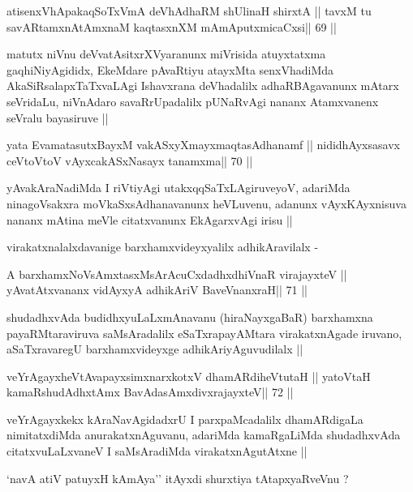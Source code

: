 \begin{shl}
atisenxVhA\s pakaqSoTxVmA deVhAdhaRM shUlinaH shirxtA ||
tavxM tu savARtamxnA\s\s tAmxnaM kaqtasxnXM mAmAputxmicaCxsi\hfill || 69 ||
\end{shl}

\begin{artha}
matutx niVnu deVvatAsitxrXVyaranunx miVrisida atuyxtatxma
gaqhiNiyAgididx, EkeMdare pAvaRtiyu atayxMta senxVhadiMda
AkaSiRsalapxTaTxvaLAgi Ishavxrana deVhadalilx adhaRBAgavanunx mAtarx
seVridaLu, niVnAdaro savaRrUpadalilx pUNaRvAgi nananx Atamxvanenx
seVralu bayasiruve ||
\end{artha}

\begin{shl}
yata EvamatasutxBayxM vakASxyXmayxmaqtasAdhanamf ||
nididhAyxsasavx ceVtoV\s toV vAyxcakASxNasayx tanamxma\hfill || 70 ||
\end{shl}

\begin{artha}
yAvakAraNadiMda I riVtiyAgi utakxqqSaTxLAgiruveyoV, adariMda
ninagoVsakxra moVkaSxsAdhanavanunx heVLuvenu, adanunx vAyxKAyxnisuva
nananx mAtina meVle citatxvanunx EkAgarxvAgi irisu ||

virakatxnalalxdavanige barxhamxvideyxyalilx adhikAravilalx -
\end{artha}

\begin{shl}
A barxhamxNoV\s sAmxtasxMsArAcuCxdadhxdhiVnaR virajayxteV ||
yAvatAtxvananx vidAyxyA adhikAriV BaveVnanxraH\hfill || 71 ||
\end{shl}

\begin{artha}
shudadhxvAda budidhxyuLaLxmAnavanu (hiraNayxgaBaR) barxhamxna
payaRMtaraviruva saMsAradalilx eSaTxrapayAMtara virakatxnAgade
iruvano, aSaTxravaregU barxhamxvideyxge adhikAriyAguvudilalx ||
\end{artha}

\begin{shl}
veYrAgayxheVtAvapayxsimxnarxkotxV dhamARdiheVtutaH ||
yatoV\s taH kamaRshudAdhxtAmx BavAdasAmxdivxrajayxteV\hfill || 72 ||
\end{shl}

\begin{artha}
veYrAgayxkekx kAraNavAgidadxrU I parxpaMcadalilx dhamARdigaLa
nimitatxdiMda anurakatxnAguvanu, adariMda kamaRgaLiMda shudadhxvAda
citatxvuLaLxvaneV I saMsAradiMda virakatxnAgutAtxne ||

`navA atiV patuyxH kAmAya'' itAyxdi shurxtiya tAtapxyaRveVnu ?
\end{artha}

